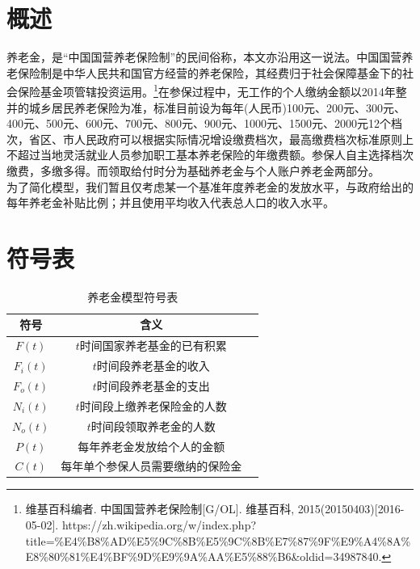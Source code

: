 \documentclass[a4paper]{article}
\begin{document}
\section{概述}
养老金，是“中国国营养老保险制”的民间俗称，本文亦沿用这一说法。中国国营养老保险制是中华人民共和国官方经营的养老保险，其经费归于社会保障基金下的社会保险基金项管辖投资运用。\footnote{维基百科编者. 中国国营养老保险制[G/OL]. 维基百科, 2015(20150403)[2016-05-02]. https://zh.wikipedia.org/w/index.php?title=\%E4\%B8\%AD\%E5\%9C\%8B\%E5\%9C\%8B\%E7\%87\%9F\%E9\%A4\%8A\%E8\%80\%81\%E4\%BF\%9D\%E9\%9A\%AA\%E5\%88\%B6\&oldid=34987840.}在参保过程中，无工作的个人缴纳金额以2014年整并的城乡居民养老保险为准，标准目前设为每年(人民币)100元、200元、300元、400元、500元、600元、700元、800元、900元、1000元、1500元、2000元12个档次，省区、市人民政府可以根据实际情况增设缴费档次，最高缴费档次标准原则上不超过当地灵活就业人员参加职工基本养老保险的年缴费额。参保人自主选择档次缴费，多缴多得。而领取给付时分为基础养老金与个人账户养老金两部分。\\
\indent
为了简化模型，我们暂且仅考虑某一个基准年度养老金的发放水平，与政府给出的每年养老金补贴比例；并且使用平均收入代表总人口的收入水平。
\section{符号表}
	\begin{table}[H]
		\centering
		\caption{养老金模型符号表}
		\label{pension_symbol}
		\begin{tabular}{ccc}
			\hline
			符号				&	含义	\\
			\hline
			$F(t)$				&	$t$时间国家养老基金的已有积累			\\
			$F_i(t)$			&	$t$时间段养老基金的收入						\\
			$F_o(t)$			&	$t$时间段养老基金的支出						\\
			$N_i(t)$			&	$t$时间段上缴养老保险金的人数			\\
			$N_o(t)$			&	$t$时间段领取养老金的人数					\\
			$P(t)$				&	每年养老金发放给个人的金额				\\
			$C(t)$				&	每年单个参保人员需要缴纳的保险金	\\
			\hline
		\end{tabular}
	\end{table}
\end{document}
